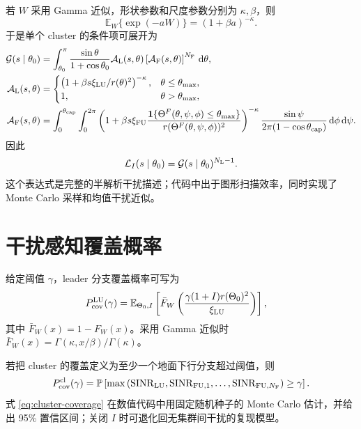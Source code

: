 \documentclass[UTF8,a4paper,11pt]{ctexart}
\newcommand{\thetac}{\theta_{\rm cap}}
\newcommand{\thetam}{\theta_{\max}}
\newcommand{\NL}{N_{\rm L}}
\newcommand{\NF}{N_{\rm F}}
\newcommand{\Prob}{\mathbb{P}}
\newcommand{\E}{\mathbb{E}}
\newcommand{\dd}{\,{\rm d}}
\newcommand{\SINR}{\operatorname{SINR}}
\newcommand{\IT}{I}
\newcommand{\Lcal}{\mathcal{L}}
\begin{document}
若 $W$ 采用 Gamma 近似，形状参数和尺度参数分别为 $\kappa,\beta$，则
\begin{equation}
    \E_W\{\exp(-aW)\}=(1+\beta a)^{-\kappa}.
\end{equation}
于是单个 cluster 的条件项可展开为
\begin{align}
    \mathcal{G}(s\mid\theta_0)
    &=
    \int_{\theta_0}^{\pi}
    \frac{\sin\theta}{1+\cos\theta_0}
    \mathcal{A}_{\rm L}(s,\theta)
    \left[
      \mathcal{A}_{\rm F}(s,\theta)
    \right]^{\NF}
    \dd\theta,
    \label{eq:single-cluster-lt}\\
    \mathcal{A}_{\rm L}(s,\theta)
    &=
    \begin{cases}
    \left(1+\beta s\xi_{\rm LU}/r(\theta)^2\right)^{-\kappa},
    & \theta\leq\thetam,\\
    1, & \theta>\thetam,
    \end{cases}\\
    \mathcal{A}_{\rm F}(s,\theta)
    &=
    \int_0^{\thetac}\int_0^{2\pi}
    \left(1+\beta s\xi_{\rm FU}
    \frac{\mathbf{1}\{\Theta^F(\theta,\psi,\phi)\leq\thetam\}}
    {r(\Theta^F(\theta,\psi,\phi))^2}
    \right)^{-\kappa}
    \frac{\sin\psi}{2\pi(1-\cos\thetac)}
    \dd\phi\dd\psi .
\end{align}
因此
\begin{equation}
    \Lcal_{\IT}(s\mid\theta_0)=\mathcal{G}(s\mid\theta_0)^{\NL-1}.
\end{equation}
这个表达式是完整的半解析干扰描述；代码中出于图形扫描效率，同时实现了
Monte Carlo 采样和均值干扰近似。

\section{干扰感知覆盖概率}

给定阈值 $\gamma$，leader 分支覆盖概率可写为
\begin{align}
    P_{\rm cov}^{\rm LU}(\gamma)
    &=
    \E_{\Theta_0,\IT}
    \left[
    \bar F_W
    \left(
    \frac{\gamma(1+\IT)r(\Theta_0)^2}{\xi_{\rm LU}}
    \right)
    \right],
    \label{eq:leader-coverage}
\end{align}
其中 $\bar F_W(x)=1-F_W(x)$。采用 Gamma 近似时
$\bar F_W(x)=\Gamma(\kappa,x/\beta)/\Gamma(\kappa)$。

若把 cluster 的覆盖定义为至少一个地面下行分支超过阈值，则
\begin{equation}
    P_{\rm cov}^{\rm cl}(\gamma)
    =
    \Prob\left[
    \max\left(\SINR_{\rm LU},\SINR_{{\rm FU},1},\ldots,\SINR_{{\rm FU},\NF}\right)
    \geq \gamma
    \right].
    \label{eq:cluster-coverage}
\end{equation}
式 \eqref{eq:cluster-coverage} 在数值代码中用固定随机种子的 Monte Carlo 估计，并给出
95\% 置信区间；关闭 $\IT$ 时可退化回无集群间干扰的复现模型。
\end{document}
